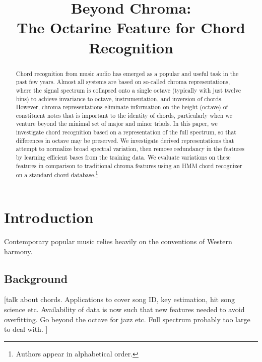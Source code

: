 \documentclass{article}
\title{Beyond Chroma: \\The Octarine Feature for Chord Recognition}
\begin{document}
%
\maketitle
%
\begin{abstract}
Chord recognition from music audio has emerged as a popular and useful task in 
the past few years.  Almost all systems are based on so-called chroma representations, 
where the signal spectrum is collapsed onto a single octave (typically with just twelve 
bins) to achieve invariance to octave, instrumentation, and inversion of chords.  However, 
chroma representations eliminate information on the height (octave) of constituent notes 
that is important to the identity of chords, particularly when we venture beyond the 
minimal set of major and minor triads.  In this paper, we investigate chord recognition based 
on a representation of the full spectrum, so that differences in octave may be preserved.  
We investigate derived representations that attempt to normalize broad spectral variation, then 
remove redundancy in the features by learning efficient bases from the training data.  We 
evaluate variations on these features in comparison to traditional chroma features using an 
HMM chord recognizer on a standard chord database.\footnote{Authors appear in alphabetical order.}

\end{abstract}
%
\section{Introduction}\label{sec:introduction}
Contemporary popular music relies heavily on the conventions of Western harmony.  

\subsection{Background}\label{sub:background}
[talk about chords. Applications to cover song ID, key estimation, hit song science etc. Availability of data is now such that new features needed to avoid overfitting. Go beyond the octave for jazz etc. Full spectrum probably too large to deal with. ]
\end{document}
